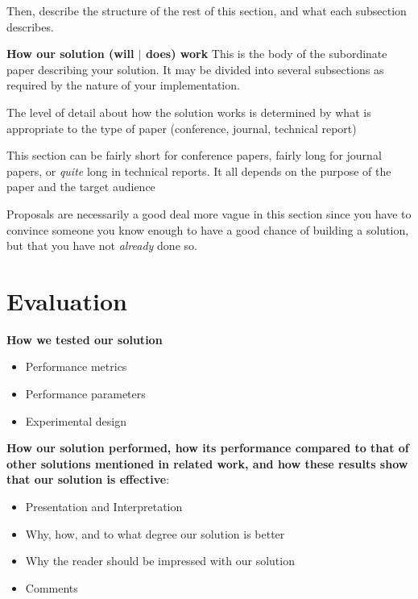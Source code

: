 \documentclass[pdf,bookmarks,colorlinks=true]{IEEEtran}
\begin{document}
Then, describe the structure of the rest of this section, and what each
subsection describes.

\textbf{How our solution (will $|$ does) work}
This is the body of the subordinate paper describing your solution. It
may be divided into several subsections as required by the nature of your
implementation.

The level of detail about how the solution works is determined by what
is appropriate to the type of paper (conference, journal, technical report)

This section can be fairly short for conference papers, fairly long for
journal papers, or {\em quite} long in technical reports. It all depends on the
purpose of the paper and the target audience

Proposals are necessarily a good deal more vague in this section since
you have to convince someone you know enough to have a good chance of building
a solution, but that you have not {\em already} done so.



\section{Evaluation}
\label{sec:Evaluation}

\textbf{How we tested our solution}
\begin{itemize}
\item   Performance metrics
\item   Performance parameters
\item   Experimental design
\end{itemize}


\textbf{How our solution performed, how its performance compared to
that of other solutions mentioned in related work, and how these results show
that our solution is effective}:

\begin{itemize}
\item   Presentation and Interpretation
\item   Why, how, and to what degree our solution is better
\item   Why the reader should be impressed with our solution
\item   Comments

\end{itemize}
\end{document}

